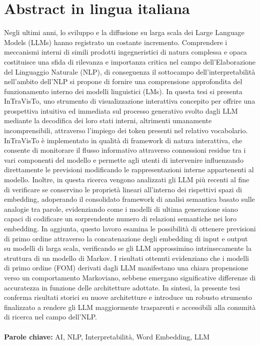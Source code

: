 \documentclass{Configuration_Files/PoliMi3i_thesis}
\begin{document}
\chapter*{Abstract in lingua italiana}
Negli ultimi anni, lo sviluppo e la diffusione su larga scala dei Large Language Models (LLMs) hanno registrato un costante incremento.
Comprendere i meccanismi interni di simili prodotti ingegneristici di natura complessa e opaca costituisce una sfida di rilevanza e importanza critica nel campo dell'Elaborazione del Linguaggio Naturale (NLP), di conseguenza il sottocampo dell'interpretabilità nell'ambito dell'NLP si propone di fornire una comprensione approfondita del funzionamento interno dei modelli linguistici (LMs).
In questa tesi si presenta InTraVisTo, uno strumento di visualizzazione interattiva concepito per offrire una prospettiva intuitiva ed immediata sul processo generativo svolto dagli LLM mediante la decodifica dei loro stati interni, altrimenti umanamente incomprensibili, attraverso l'impiego dei token presenti nel relativo vocabolario.
InTraVisTo è implementato in qualità di framework di natura interattiva, che consente di monitorare il flusso informativo attraverso connessioni residue tra i vari componenti del modello e permette agli utenti di intervenire influenzando direttamente le previsioni modificando le rappresentazioni interne appartenenti al modello.
Inoltre, in questa ricerca vengono analizzati gli LLM più recenti al fine di verificare se conservino le proprietà lineari all'interno dei rispettivi spazi di embedding, adoperando il consolidato framework di analisi semantica basato sulle analogie tra parole, evidenziando come i modelli di ultima generazione siano capaci di codificare un sorprendente numero di relazioni semantiche nei loro embedding.
In aggiunta, questo lavoro esamina le possibilità di ottenere previsioni di primo ordine attraverso la concatenazione degli embedding di input e output su modelli di larga scala, verificando se gli LLM approssimino intrinsecamente la struttura di un modello di Markov.
I risultati ottenuti evidenziano che i modelli di primo ordine (FOM) derivati dagli LLM manifestano una chiara propensione verso un comportamento Markoviano, sebbene emergano significative differenze di accuratezza in funzione delle architetture adottate.
In sintesi, la presente tesi conferma risultati storici su nuove architetture e introduce un robusto strumento finalizzato a rendere gli LLM maggiormente trasparenti e accessibili alla comunità di ricerca nel campo dell'NLP.
\\
\\
\textbf{Parole chiave:} AI, NLP, Interpretabilità, Word Embedding, LLM
\end{document}
